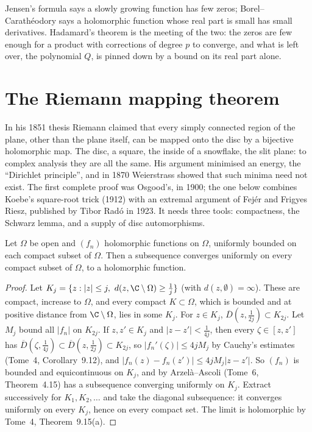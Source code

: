 \begin{beauty}
Jensen's formula says a slowly growing function has few zeros; Borel--Carath\'eodory says a holomorphic function whose real part is small has small derivatives. Hadamard's theorem is the meeting
of the two: the zeros are few enough for a product with corrections of degree $p$ to converge, and what is left over, the polynomial $Q$, is pinned down by a bound on its real part alone.
\end{beauty}

\section{The Riemann mapping theorem}

In his 1851 thesis Riemann claimed that every simply connected region of the plane, other than the plane itself, can be mapped onto the disc by a bijective holomorphic map. The disc, a
square, the inside of a snowflake, the slit plane: to complex analysis they are all the same. His argument minimised an energy, the ``Dirichlet principle'', and in 1870 Weierstrass showed that
such minima need not exist. The first complete proof was Osgood's, in 1900; the one below combines Koebe's square-root trick (1912) with an extremal argument of Fej\'er and Frigyes Riesz, published by
Tibor Rad\'o in 1923. It needs three tools: compactness, the Schwarz lemma, and a supply of disc automorphisms.

\begin{theorem}[Montel, 1907]\label{thm:montel}
Let $\Omega$ be open and $(f_n)$ holomorphic functions on $\Omega$, uniformly bounded on each compact subset of $\Omega$. Then a subsequence converges uniformly on every compact subset of $\Omega$, to a holomorphic
function.
\end{theorem}
\begin{proof}
Let $K_j=\{z:|z|\le j,\ d(z,\C\setminus\Omega)\ge\frac1j\}$ (with $d(z,\emptyset)=\infty$). These are compact, increase to $\Omega$, and every compact $K\subset\Omega$, which is bounded and at positive distance from
$\C\setminus\Omega$, lies in some $K_j$. For $z\in K_j$, $\overline D(z,\frac1{2j})\subset K_{2j}$. Let $M_j$ bound all $|f_n|$ on $K_{2j}$. If $z,z'\in K_j$ and $|z-z'|<\frac1{4j}$, then every $\zeta\in[z,z']$ has
$\overline D(\zeta,\frac1{4j})\subset\overline D(z,\frac1{2j})\subset K_{2j}$, so $|f_n'(\zeta)|\le4jM_j$ by Cauchy's estimates (Tome~4, Corollary~9.12), and $|f_n(z)-f_n(z')|\le4jM_j|z-z'|$. So $(f_n)$ is bounded and
equicontinuous on $K_j$, and by Arzel\`a--Ascoli (Tome~6, Theorem~4.15) has a subsequence converging uniformly on $K_j$. Extract successively for $K_1,K_2,\dots$ and take the diagonal subsequence: it
converges uniformly on every $K_j$, hence on every compact set. The limit is holomorphic by Tome~4, Theorem~9.15(a).
\end{proof}

